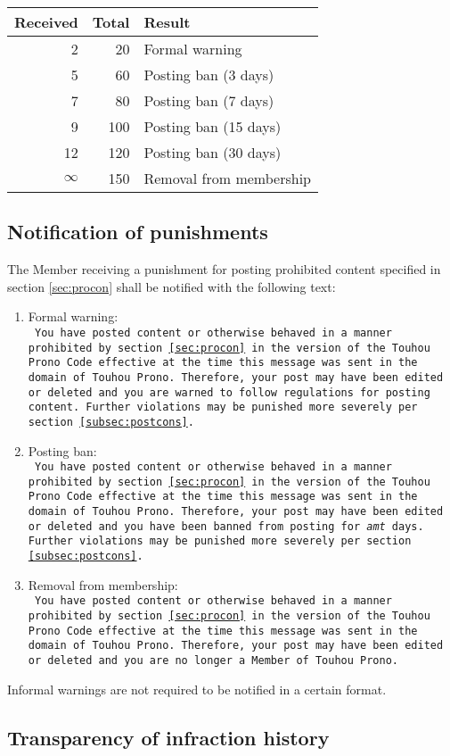 \documentclass[10pt]{book}
\begin{document}
\begin{tabular}{|r|r|l|}
 \hline
 Received & Total & Result \\ \hline
 2 & 20 & Formal warning \\
 5 & 60 & Posting ban (3 days) \\
 7 & 80 & Posting ban (7 days) \\
 9 & 100 & Posting ban (15 days) \\
 12 & 120 & Posting ban (30 days) \\
 $\infty$ & 150 & Removal from membership \\ \hline
\end{tabular}

\subsection{Notification of punishments}

The Member receiving a punishment for posting prohibited content specified in section \ref{sec:procon} shall be notified with the following text:

\newcommand{\nintro}{You have posted content or otherwise behaved in a manner prohibited by section \ref{sec:procon} in the version of the Touhou Prono Code effective at the time this message was sent in the domain of Touhou Prono. Therefore, your post may have been edited or deleted and }
\newcommand{\nfinal}{Further violations may be punished more severely per section \ref{subsec:postcons}.}

\begin{enumerate}
 \item Formal warning: \\
 \texttt{
  \nintro you are warned to follow regulations for posting content. \nfinal
 }
 \item Posting ban: \\
 \texttt{
  \nintro you have been banned from posting for \textit{amt} days. \nfinal
 }
 \item Removal from membership: \\
  \texttt{
   \nintro you are no longer a Member of Touhou Prono.
  }
\end{enumerate}

Informal warnings are not required to be notified in a certain format.

\subsection{Transparency of infraction history}
\end{document}
